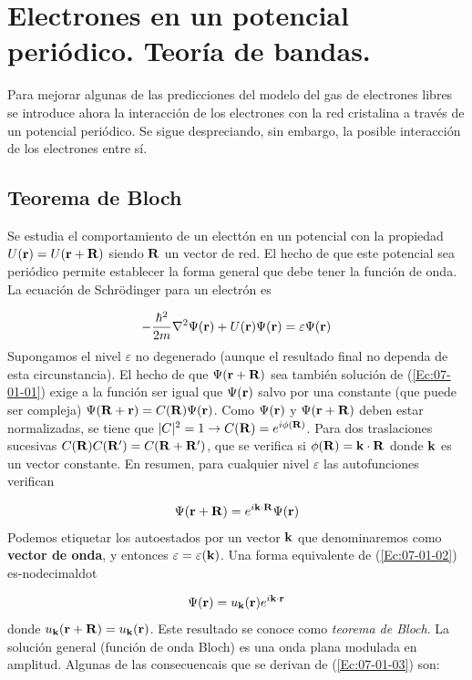 \chapter{Electrones en un potencial periódico. Teoría de bandas.} \label{Ch:07}

Para mejorar algunas de las predicciones del modelo del gas de electrones libres se introduce ahora la interacción de los electrones con la red cristalina a través de un potencial periódico. Se sigue despreciando, sin embargo, la posible interacción de los electrones entre sí.

\section{Teorema de Bloch}

Se estudia el comportamiento de un electtón en un potencial con la propiedad $U(\mathbf{r})= U(\mathbf{r}+\mathbf{R})$ siendo $\mathbf{R}$ un vector de red. El hecho de que este potencial sea periódico permite establecer la forma general que debe  tener la función de onda. La ecuación de Schrödinger para un electrón es

\begin{equation}  
    - \frac{\hbar^2}{2m} \nabla^2 \Psi (\mathbf{r}) + U(\mathbf{r}) \Psi (\mathbf{r}) = \varepsilon \Psi (\mathbf{r}) \label{Ec:07-01-01}
\end{equation}
Supongamos el nivel $\varepsilon$ no degenerado (aunque el resultado final no dependa de esta circunstancia). El hecho de que $\Psi (\mathbf{r}+ \mathbf{R})$ sea también solución de (\ref{Ec:07-01-01}) exige a la función ser igual que $\Psi(\mathbf{r})$ salvo por una constante (que puede ser compleja) $\Psi (\mathbf{R}+\mathbf{r})=C(\mathbf{R}) \Psi (\mathbf{r})$. Como $\Psi(\mathbf{r})$ y $\Psi (\mathbf{r} + \mathbf{R})$ deben estar normalizadas, se tiene que $|C|^2 = 1 \rightarrow C(\mathbf{R})=e^{i \phi(\mathbf{R})}$. Para dos traslaciones sucesivas $C(\mathbf{R}) C(\mathbf{R}') = C(\mathbf{R}+\mathbf{R}')$, que se verifica si $\phi(\mathbf{R})=\mathbf{k} \cdot \mathbf{R}$ donde $\mathbf{k}$ es un vector constante. En resumen, para cualquier nivel $\varepsilon$ las autofunciones verifican 

\begin{eqnarray}
    \Psi (\mathbf{r} + \mathbf{R}) = e^{i\mathbf{k} \cdot \mathbf{R}} \Psi (\mathbf{r}) \label{Ec:07-01-02}
\end{eqnarray}
Podemos etiquetar los autoestados por un vector $\mathbf{k}$ que denominaremos como \textbf{vector de onda}, y entonces $\varepsilon=\varepsilon(\mathbf{k})$. Una forma equivalente de (\ref{Ec:07-01-02}) es-nodecimaldot

\begin{eqnarray}
    \Psi (\mathbf{r}) = u_{\mathbf{k}} (\mathbf{r}) e^{i \mathbf{k} \cdot \mathbf{r}} \label{Ec:07-01-03}
\end{eqnarray}
donde $u_{\mathbf{k}} (\mathbf{r} + \mathbf{R}) = u_{\mathbf{k}} (\mathbf{r})$. Este resultado se conoce como \textit{teorema de Bloch}. La solución general (función de onda Bloch) es una onda plana modulada en amplitud. Algunas de las consecuencais que se derivan de (\ref{Ec:07-01-03}) son:

